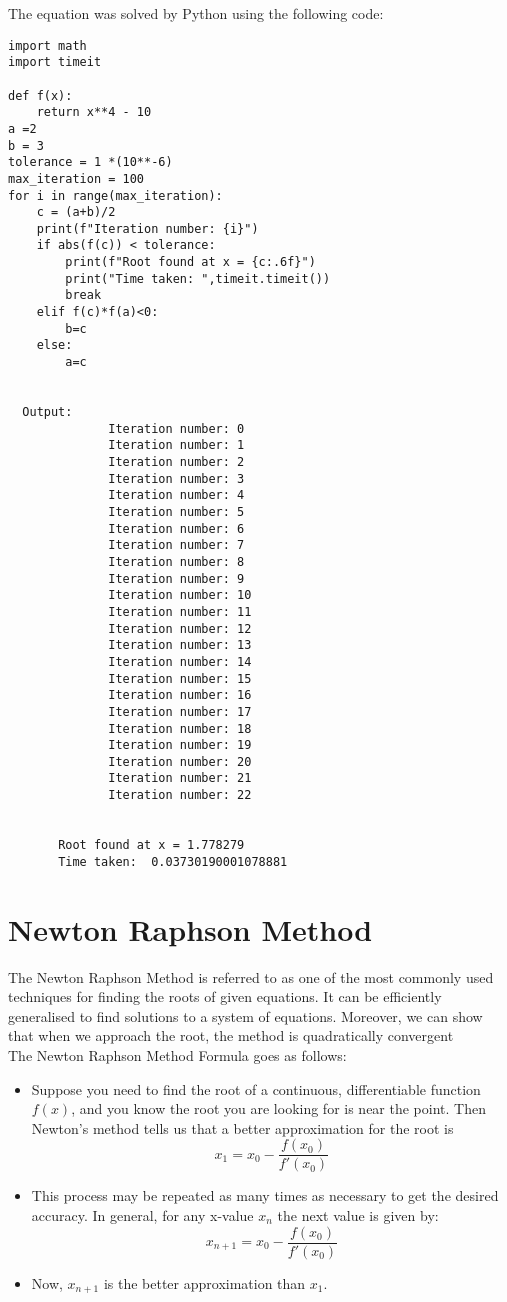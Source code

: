 \documentclass{article}
\begin{document}
The equation was solved by Python using the following code:
\begin{verbatim}
import math
import timeit

def f(x):
    return x**4 - 10
a =2 
b = 3
tolerance = 1 *(10**-6)
max_iteration = 100
for i in range(max_iteration):
    c = (a+b)/2
    print(f"Iteration number: {i}")
    if abs(f(c)) < tolerance:
        print(f"Root found at x = {c:.6f}")  
        print("Time taken: ",timeit.timeit())
        break
    elif f(c)*f(a)<0:
        b=c
    else:
        a=c
  
  
  Output:
              Iteration number: 0
              Iteration number: 1
              Iteration number: 2
              Iteration number: 3
              Iteration number: 4
              Iteration number: 5
              Iteration number: 6
              Iteration number: 7
              Iteration number: 8
              Iteration number: 9
              Iteration number: 10
              Iteration number: 11
              Iteration number: 12
              Iteration number: 13
              Iteration number: 14
              Iteration number: 15
              Iteration number: 16
              Iteration number: 17
              Iteration number: 18
              Iteration number: 19
              Iteration number: 20
              Iteration number: 21
              Iteration number: 22

      
       Root found at x = 1.778279
       Time taken:  0.03730190001078881
\end{verbatim}








\pagebreak

\section{Newton Raphson Method}
The Newton Raphson Method is referred to as one of the most commonly used techniques for finding the roots of given equations. It can be efficiently generalised to find solutions to a system of equations. Moreover, we can show that when we approach the root, the method is quadratically convergent\\

The Newton Raphson Method Formula goes as follows:

\begin{itemize}
        \item Suppose you need to find the root of a continuous, differentiable function $f(x)$, and you know the root you are looking for is near the point. Then Newton's method tells us that a better approximation for the root is $$x_1 = x_0 - \frac{f(x_0)}{f\prime(x_0)}$$

        \item This process may be repeated as many times as necessary to get the desired accuracy. In general, for any x-value $x_n$ the next value is given by: $$x_ {n+1} = x_0 - \frac{f(x_0)}{f\prime(x_0)}$$
        \item Now, $x_ {n+1}$ is the better approximation than $x_1$.
         
\end{itemize}
\end{document}
